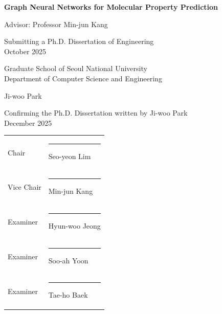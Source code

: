 \thispagestyle{empty}
\begin{center}
{\large\bfseries Graph Neural Networks for Molecular Property Prediction\par}
\vspace{0.3in}
Advisor: Professor Min-jun Kang\par
\vspace{0.3in}
Submitting a Ph.D. Dissertation of Engineering\\
October 2025\par
\vspace{0.2in}
Graduate School of Seoul National University\\
Department of Computer Science and Engineering\par
\vspace{0.2in}
Ji-woo Park\par
\vspace{0.3in}
Confirming the Ph.D. Dissertation written by Ji-woo Park\\
December 2025\par
\vspace{0.4in}
\begin{tabular}{@{}ll@{}}
Chair & \rule{2.5in}{0.4pt}\quad Seo-yeon Lim\\[1.2em]
Vice Chair & \rule{2.5in}{0.4pt}\quad Min-jun Kang\\[1.2em]
Examiner & \rule{2.5in}{0.4pt}\quad Hyun-woo Jeong\\[1.2em]
Examiner & \rule{2.5in}{0.4pt}\quad Soo-ah Yoon\\[1.2em]
Examiner & \rule{2.5in}{0.4pt}\quad Tae-ho Baek\\[1.2em]
\end{tabular}
\end{center}
\clearpage
